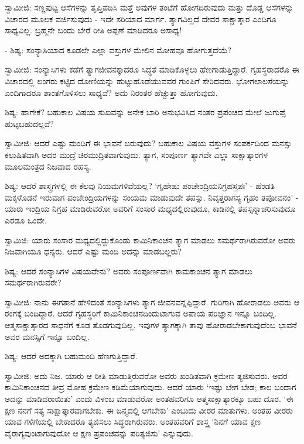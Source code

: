 ಸ್ವಾಮೀಜಿ: ಸಣ್ಣಪುಟ್ಟ ಆಸೆಗಳನ್ನು ತೃಪ್ತಿಪಡಿಸಿ ಮತ್ತೆ ಅವುಗಳ ತಂಟೆಗೆ ಹೋಗದಿರುವುದು ಮತ್ತು ದೊಡ್ಡ ಆಸೆಗಳನ್ನು ವಿಚಾರದ ಮೂಲಕ ವರ್ಜಿಸುವುದು - ಇದೇ ಸರಿಯಾದ ಮಾರ್ಗ. ತ್ಯಾಗವಿಲ್ಲದೆ ದೇವರ ಸಾಕ್ಷಾತ್ಕಾರ ಎಂದಿಗೂ ಸಾಧ್ಯವಿಲ್ಲ. ಬ್ರಹ್ಮನೇ ಬಂದು ಬೇರೆ ರೀತಿ ಅಪ್ಪಣೆ ಮಾಡಿದರೂ ಅಸಾಧ್ಯ!

- ಶಿಷ್ಯ: ಸಂನ್ಯಾಸಿಯಾದ ಕೂಡಲೇ ಎಲ್ಲಾ ವಸ್ತುಗಳ ಮೇಲಿನ ಮೋಹವೂ ಹೋಗುತ್ತದೆಯೆ?

ಸ್ವಾಮೀಜಿ: ಸಂನ್ಯಾಸಿಗಳು ಕಡೆಗೆ ತ್ಯಾಗಜೀವನಕ್ಕಾದರೂ ಸಿದ್ಧತೆ ಮಾಡಿಕೊಳ್ಳಲು ಹೆಣಗಾಡುತ್ತಿದ್ದಾರೆ. ಗೃಹಸ್ಥರಾದರೊ ಈ ವಿಚಾರದಲ್ಲಿ ಲಂಗರು ಕಟ್ಟಿದ ದೋಣಿಯನ್ನು ಹುಟ್ಟುಹೊಡೆಯುವವರ ಗುಂಪಿಗೆ ಸೇರಿದವರು. ಭೋಗಲಾಲಸೆಯನ್ನು ಎಂದಿಗಾದರೂ ಶಾಂತಗೊಳಿಸಲು ಸಾಧ್ಯವೆ? ಅದು ನಿರಂತರ ಹೆಚ್ಚುತ್ತಾ ಹೋಗುವುದು.

ಶಿಷ್ಯ: ಹಾಗೇಕೆ? ಬಹುಕಾಲ ವಿಷಯ ಸುಖವನ್ನು ಅನೇಕ ಬಾರಿ ಅನುಭವಿಸಿದ ನಂತರ ಪ್ರಪಂಚದ ಮೇಲೆ ಜುಗುಪ್ಸೆ ಹುಟ್ಟಬಹುದಲ್ಲವೆ?

ಸ್ವಾಮೀಜಿ: ಆದರೆ ಎಷ್ಟು ಮಂದಿಗೆ ಈ ಭಾವನೆ ಬರುವುದು? ಬಹುಕಾಲ ವಿಷಯ ವಸ್ತುಗಳ ಸಂಪರ್ಕದಿಂದ ಮನಸ್ಸು ಕಲುಷಿತವಾಗಿ ಅದರ ಮುದ್ರೆ ಚಿರಮುದ್ರಿತವಾಗುವುದು. ತ್ಯಾಗ, ಸಂಪೂರ್ಣ ತ್ಯಾಗವೇ ಎಲ್ಲಾ ಸಾಕ್ಷಾತ್ಕಾರಗಳ ಮೂಲಮಂತ್ರದ ನಿಜವಾದ ರಹಸ್ಯ.

ಶಿಷ್ಯ: ಆದರೆ ಶಾಸ್ತ್ರಗಳಲ್ಲಿ ಈ ಕೆಲವು ನಿಯಮಗಳಿವೆಯಲ್ಲ? ‘ಗೃಹೇಷು ಪಂಚೇಂದ್ರಿಯನಿಗ್ರಹಸ್ತಪಃ’ - ಹೆಂಡತಿ ಮಕ್ಕಳೊಡನೆ ಇರುವಾಗ ಪಂಚೇಂದ್ರಿಯಗಳನ್ನು ಸಂಯಮ ಮಾಡುವುದೇ ತಪಸ್ಸು. ನಿವೃತ್ತರಾಗಸ್ಯ ಗೃಹಂ ತಪೋವನಂ' - ಯಾರು ಇಂದ್ರಿಯ ನಿಗ್ರಹ ಮಾಡಿರುವರೋ ಅವರಿಗೆ ಸಂಸಾರ ಮಧ್ಯದಲ್ಲಿರುವುದೂ, ಕಾಡಿನಲ್ಲಿ ತಪಸ್ಸನ್ನಾಚರಿಸುವುದೂ ಎರಡೂ ಒಂದೇ.

ಸ್ವಾಮಿಜಿ: ಯಾರು ಸಂಸಾರ ಮಧ್ಯದಲ್ಲಿದ್ದುಕೊಂಡು ಕಾಮಿನಿಕಾಂಚನ ತ್ಯಾಗ ಮಾಡಲು ಸಮರ್ಥರಾಗಿರುವರೋ ಅವರು ನಿಜವಾಗಿಯೂ ಧನ್ಯರು. ಆದರೆ ಎಷ್ಟು ಮಂದಿ ಅದನ್ನು ಮಾಡಬಲ್ಲರು?

ಶಿಷ್ಯ: ಆದರೆ ಸಂನ್ಯಾಸಿಗಳ ವಿಷಯವೇನು? ಅವರು ಸಂಪೂರ್ಣವಾಗಿ ಕಾಮಕಾಂಚನ ತ್ಯಾಗ ಮಾಡಲು ಸಮರ್ಥರಾಗಿರುವರೇ?

ಸ್ವಾಮೀಜಿ: ನಾನು ಈಗತಾನೆ ಹೇಳಿದಂತೆ ಸಂನ್ಯಾಸಿಗಳು ತ್ಯಾಗ ಜೀವನವನ್ನಪ್ಪಿದ್ದಾರೆ. ಗುರಿಗಾಗಿ ಹೋರಾಡಲು ಅವರು ಆ ರಂಗಕ್ಕೆ ಬಂದಿದ್ದಾರೆ. ಆದರೆ ಗೃಹಸ್ಥರಿಗೆ ಕಾಮಿನಿಕಾಂಚನದಿಂದುಟಾಗುವ ಅಪಾಯ ಪರಿಜ್ಞಾನ ಇನ್ನೂ ಬಂದಿಲ್ಲ. ಆತ್ಮಸಾಕ್ಷಾತ್ಕಾರದ ಸಾಧನೆಗೆ ಕೂಡ ತೊಡಗುವುದಿಲ್ಲ. ಇವುಗಳ ತ್ಯಾಗಕ್ಕಾಗಿ ತಾವು ಹೋರಾಡಬೇಕಾಗುವುದೆಂಬ ಭಾವನೆ ಅವರ ಮನಸ್ಸಿಗೆ ಇನ್ನೂ ಬಂದಿಲ್ಲ.

ಶಿಷ್ಯ: ಆದರೆ ಅದಕ್ಕಾಗಿ ಬಹುಮಂದಿ ಹೆಣಗುತ್ತಿದ್ದಾರೆ.

ಸ್ವಾಮೀಜಿ: ಅದು ನಿಜ. ಯಾರು ಆ ರೀತಿ ಮಾಡುತ್ತಿರುವರೋ ಅವರು ಖಂಡಿತವಾಗಿ ಕ್ರಮೇಣ ತ್ಯಜಿಸುವರು. ಅವರ ಕಾಮಿನಿಕಾಂಚನದ ತೀವ್ರ ಮೋಹ ಕ್ರಮೇಣ ಕಡಿಮೆಯಾಗುವುದು. ಆದರೆ ಯಾರು ‘ಇಷ್ಟು ಬೇಗ ಬೇಡ; ಕಾಲ ಬಂದಾಗ ಅದನ್ನು ಮಾಡಿದರಾಯಿತು’ ಎಂದು ವಿಳಂಬ ಮಾಡುವರೋ ಅಂತಹವರಿಗೂ ಆತ್ಮಸಾಕ್ಷಾತ್ಕಾರಕ್ಕೂ ಬಹು ದೂರ. ‘ಈ ಕ್ಷಣ ನನಗೆ ಸತ್ಯ ಸಾಕ್ಷಾತ್ಕಾರವಾಗಬೇಕು. ಈ ಜನ್ಮದಲ್ಲಿ ಆಗಬೇಕು’ ಎಂಬುದು ವೀರರ ಮಾತುಗಳು. ಅಂತಹ ವೀರರು ಯಾವ ಗಳಿಗೆಯಲ್ಲಿ ಬೇಕಾದರೂ ತ್ಯಜಿಸಲು ಸಿದ್ಧರಾಗಿರುವರು. ಅಂತಹವರಿಗೆ ಶಾಸ್ತ್ರ ‘ನಿನಗೆ ಯಾವ ಕ್ಷಣ ವೈರಾಗ್ಯವುಂಟಾಗುವುದೋ ಆ ಕ್ಷಣ ಪ್ರಪಂಚವನ್ನು ಪರಿತ್ಯಜಿಸು’ ಎನ್ನುವುದು.

